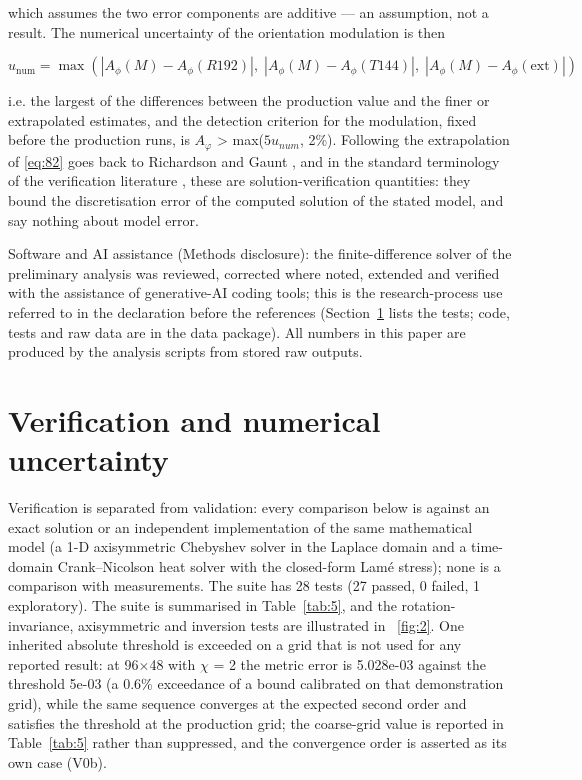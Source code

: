 \documentclass[preprint,12pt]{elsarticle}
\begin{document}
which assumes the two error components are additive --- an assumption, not a result. The numerical uncertainty of the orientation modulation is then

\begin{equation}
u_{\mathrm{num}}=\max\left(|A_\phi(M)-A_\phi(R192)|,\;|A_\phi(M)-A_\phi(T144)|,\;|A_\phi(M)-A_\phi(\mathrm{ext})|\right) 
\label{eq:84}
\end{equation}

i.e. the largest of the differences between the production value and the finer or extrapolated estimates, and the detection criterion for the modulation, fixed before the production runs, is $A_{\varphi}$ > max($5u_{num}$, 2\%). Following the extrapolation of \eqref{eq:82} goes back to Richardson and Gaunt \cite{richardson1927}, and in the standard terminology of the verification literature \cite{oberkampf2010,pelletier2000}, these are solution-verification quantities: they bound the discretisation error of the computed solution of the stated model, and say nothing about model error.

Software and AI assistance (Methods disclosure): the finite-difference solver of the preliminary analysis was reviewed, corrected where noted, extended and verified with the assistance of generative-AI coding tools; this is the research-process use referred to in the declaration before the references (Section~\ref{sec:5} lists the tests; code, tests and raw data are in the data package). All numbers in this paper are produced by the analysis scripts from stored raw outputs.

\section{Verification and numerical uncertainty}
\label{sec:5}

Verification is separated from validation: every comparison below is against an exact solution or an independent implementation of the same mathematical model (a 1-D axisymmetric Chebyshev solver in the Laplace domain and a time-domain Crank--Nicolson heat solver with the closed-form Lam\'e stress); none is a comparison with measurements. The suite has 28 tests (27 passed, 0 failed, 1 exploratory). The suite is summarised in Table~\ref{tab:5}, and the rotation-invariance, axisymmetric and inversion tests are illustrated in \figurename~\ref{fig:2}. One inherited absolute threshold is exceeded on a grid that is not used for any reported result: at 96$\times$48 with $\chi$ = 2 the metric error is 5.028e-03 against the threshold 5e-03 (a 0.6\% exceedance of a bound calibrated on that demonstration grid), while the same sequence converges at the expected second order and satisfies the threshold at the production grid; the coarse-grid value is reported in Table~\ref{tab:5} rather than suppressed, and the convergence order is asserted as its own case (V0b).
\end{document}
